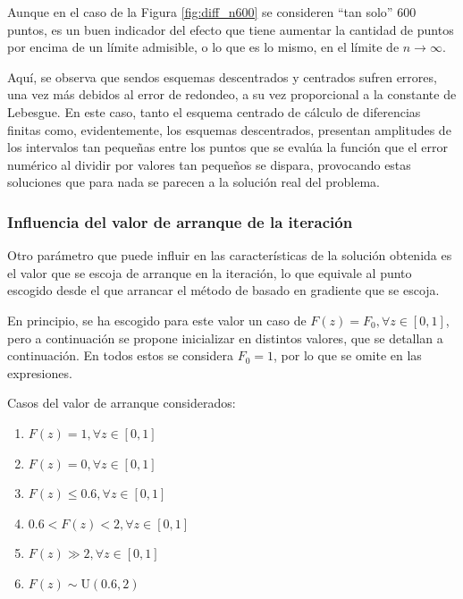 Aunque en el caso de la Figura \ref{fig:diff_n600} se consideren “tan solo” 600 puntos, es un buen indicador del efecto que tiene aumentar la cantidad de puntos por encima de un límite admisible, o lo que es lo mismo, en el límite de $n \to \infty$. 

Aquí, se observa que sendos esquemas descentrados y centrados sufren errores, una vez más debidos al error de redondeo, a su vez proporcional a la constante de Lebesgue. En este caso, tanto el esquema centrado de cálculo de diferencias finitas como, evidentemente, los esquemas descentrados, presentan amplitudes de los intervalos tan pequeñas entre los puntos que se evalúa la función que el error numérico al dividir por valores tan pequeños se dispara, provocando estas soluciones que para nada se parecen a la solución real del problema.

\subsubsection{Influencia del valor de arranque de la iteración}

Otro parámetro que puede influir en las características de la solución obtenida es el valor que se escoja de arranque en la iteración, lo que equivale al punto escogido desde el que arrancar el método de basado en gradiente que se escoja. 

En principio, se ha escogido para este valor un caso de $F(z) = F_0 , \forall z \in [0, 1]$, pero a continuación se propone inicializar en distintos valores, que se detallan a continuación. En todos estos se considera $F_0 = 1$, por lo que se omite en las expresiones.

Casos del valor de arranque considerados:

\begin{enumerate}
    \item $F(z) = 1 , \forall z \in [0, 1]$
    
    \item $F(z) = 0 , \forall z \in [0, 1]$

    \item $F(z) \leq 0.6 , \forall z \in [0, 1]$

    \item $0.6 < F(z) < 2 , \forall z \in [0, 1]$

    \item $F(z) \gg 2 , \forall z \in [0, 1]$
    
    \item $F(z) \sim \text{U}(0.6, 2)$
\end{enumerate}


